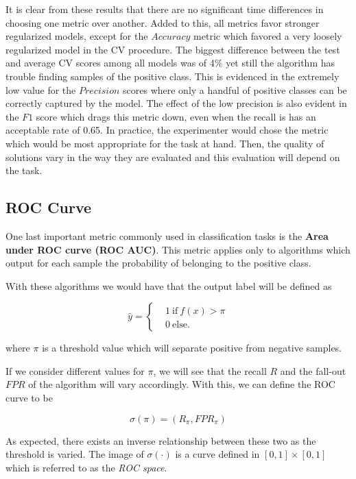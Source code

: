 It is clear from these results  that there are no significant time differences in choosing one metric over another. 
Added to this, all metrics favor stronger regularized models, except for the $Accuracy$ metric which favored a very loosely regularized model in the CV procedure.
The biggest difference between the test and average CV scores among all models was of 4\% yet still the algorithm has trouble finding samples of the positive class.
This is evidenced in the extremely low value for the $Precision$ scores where only a handful of positive classes can be correctly captured by the model.
The effect of the low precision is also evident in the $F1$ score which drags this metric down, even when the recall is has an acceptable rate of 0.65.
In practice, the experimenter would chose the metric which would be most appropriate for the task at hand.
Then, the quality of solutions vary in the way they are evaluated and this evaluation will depend on the task.


\subsection{ROC Curve}\label{sub:roc_curve}

One last important metric commonly used in classification tasks is the \textbf{Area under ROC curve (ROC AUC)}.
This metric applies only to algorithms which output for each sample the probability of belonging to the positive class.

With these algorithms we would have that the output label will be defined as

\begin{equation}
\hat{y} =
\begin{cases}
&1 \ \mbox{if} \ f(x) > \pi \\
&0 \ \mbox{else}.
\end{cases}
\end{equation}

where $\pi$ is a threshold value which will separate positive from negative samples.


If we consider different values for $\pi$, we will see that the recall $R$ and the fall-out $FPR$ of the algorithm will vary accordingly.
With this, we can define the ROC curve to be

\begin{equation}
\sigma(\pi) = (R_\pi, FPR_\pi)
\end{equation}

As expected, there exists an inverse relationship between these two as the threshold is varied.
The image of $\sigma(\cdot)$ is a curve defined in $[0,1]\times[0,1]$ which is referred to as the \textit{ROC space}.

